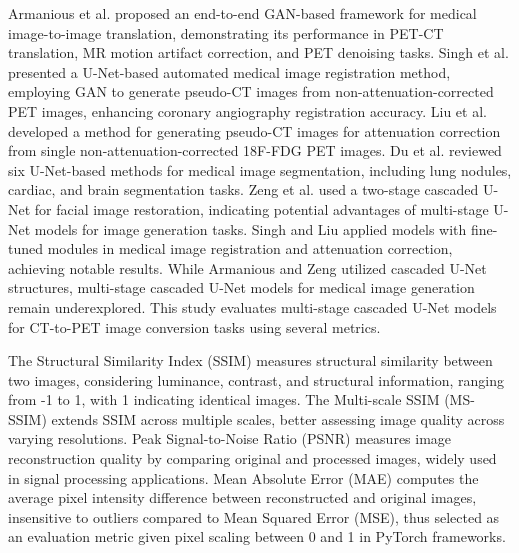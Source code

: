 \documentclass[a4paper, times, 10pt,twocolumn]{article}
\begin{document}
Armanious et al. \cite{armanious_medgan_2020} proposed an end-to-end GAN-based framework for medical image-to-image translation, demonstrating its performance in PET-CT translation, MR motion artifact correction, and PET denoising tasks. Singh et al. \cite{singh_automated_2023} presented a U-Net-based automated medical image registration method, employing GAN to generate pseudo-CT images from non-attenuation-corrected PET images, enhancing coronary angiography registration accuracy. Liu et al. \cite{liu_deep_2018} developed a method for generating pseudo-CT images for attenuation correction from single non-attenuation-corrected 18F-FDG PET images. Du et al. \cite{du_medical_2020} reviewed six U-Net-based methods for medical image segmentation, including lung nodules, cardiac, and brain segmentation tasks. Zeng et al. \cite{zeng_swin-casunet_2022} used a two-stage cascaded U-Net for facial image restoration, indicating potential advantages of multi-stage U-Net models for image generation tasks. Singh and Liu applied models with fine-tuned modules in medical image registration and attenuation correction, achieving notable results. While Armanious and Zeng utilized cascaded U-Net structures, multi-stage cascaded U-Net models for medical image generation remain underexplored. This study evaluates multi-stage cascaded U-Net models for CT-to-PET image conversion tasks using several metrics.

The Structural Similarity Index \cite{zhou_wang_image_2004} (SSIM) measures structural similarity between two images, considering luminance, contrast, and structural information, ranging from -1 to 1, with 1 indicating identical images. The Multi-scale SSIM (MS-SSIM) extends SSIM across multiple scales, better assessing image quality across varying resolutions. Peak Signal-to-Noise Ratio \cite{hore_image_2010} (PSNR) measures image reconstruction quality by comparing original and processed images, widely used in signal processing applications. Mean Absolute Error\cite{chai_root_2014} (MAE) computes the average pixel intensity difference between reconstructed and original images, insensitive to outliers compared to Mean Squared Error (MSE), thus selected as an evaluation metric given pixel scaling between 0 and 1 in PyTorch frameworks.
\end{document}
